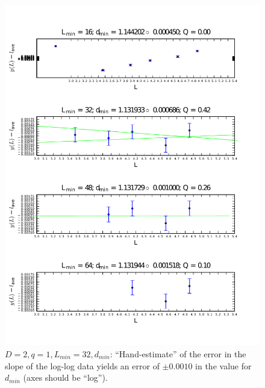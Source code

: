 \documentclass[pre,preprint]{revtex4}
\begin{document}
\begin{figure}[htp]
\centering
\includegraphics[width=.9\textwidth]{figures/d_min_D2q1_4601_fig_handfit_noboxes.pdf}
\caption{$D=2, q=1, L_{min}=32,d_{min}$: ``Hand-estimate'' of the error in the slope of the log-log data yields an error of $\pm 0.0010$ in the value for $d_{min}$ (axes should be ``log'').}\label{fig:b}
\end{figure}




\end{document}
